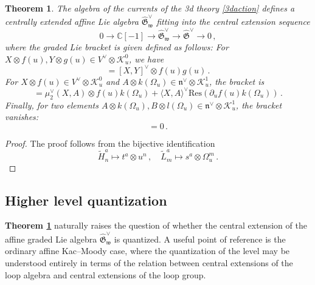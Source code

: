 \documentclass[11pt]{amsart}
\newcommand{\C}{{\mathbb C}}
\newcommand{\tL}{{\tilde L}}
\newcommand{\tH}{{\tilde H}}
\newcommand{\CK}{{\mathcal K}}
\newcommand{\fn}{\mathfrak{n}}
\newcommand{\fG}{\mathfrak{G}}
\numberwithin{equation}{section}
\numberwithin{figure}{section}
\numberwithin{table}{section}
\theoremstyle{thm}
\newtheorem{theorem}{Theorem}[subsection]
\numberwithin{equation}{subsection}
\theoremstyle{definition}
\theoremstyle{rem}
\newcommand{\HC}[1]{\textcolor{red}{HC: #1}}
\begin{document}
\begin{theorem}\label{mainthm}
The algebra of the currents of the 3d theory \eqref{3daction} defines a centrally extended affine Lie algebra $\widehat{\fG}^\vee_{\mathfrak{w}}$ fitting into the central extension sequence
\begin{equation}
    0 \rightarrow \C[-1] \rightarrow \widehat{\fG}^\vee_{\mathfrak{w}} \rightarrow \widehat{\fG}^\vee \rightarrow 0 \,,\label{sesq}
\end{equation}
where the graded Lie bracket is given defined as follows:
For \( X \otimes f(u), Y \otimes g(u) \in V^\vee \otimes \CK_u^0 \), we have
\begin{equation}
    [X \otimes f(u), Y \otimes g(u)] = [X,Y]^\vee \otimes f(u)g(u) \,.
\end{equation}
For \( X \otimes f(u) \in V^\vee \otimes \CK_u^0 \) and \( A \otimes k(\Omega_u) \in \fn^\vee \otimes \CK_u^1 \), the bracket is
\begin{equation}
    [X \otimes f(u), A \otimes k(\Omega_u)] = \mu_2^\vee(X,A) \otimes f(u)k(\Omega_u) + \langle X,A\rangle^\vee\mathrm{Res}(\partial_u f(u)k(\Omega_u))\,.
\end{equation}
Finally, for two elements \( A \otimes k(\Omega_u), B \otimes l(\Omega_u) \in \fn^\vee \otimes \CK_u^1 \), the bracket vanishes:
\begin{equation}
    [A \otimes k(\Omega_u), B \otimes l(\Omega_u)] = 0\,.
\end{equation}

\end{theorem}

\begin{proof}
    The proof follows from the bijective identification 
    \begin{equation}
    \label{ec:identification}
        \tH_n^a \mapsto t^a\otimes u^n \,,\quad \tL_m^a \mapsto s^a\otimes \Omega^m_u\,.
    \end{equation}
\end{proof}


\subsection{Higher level quantization}

\textbf{Theorem \ref{mainthm}} naturally raises the question of whether the central extension of the affine graded Lie algebra $\widehat{\mathfrak G}^{\vee}_{\mathfrak w}$ is quantized. A useful point of reference is the ordinary affine Kac--Moody case, where the quantization of the level may be understood entirely in terms of the relation between central extensions of the loop algebra and central extensions of the loop group.
\end{document}

